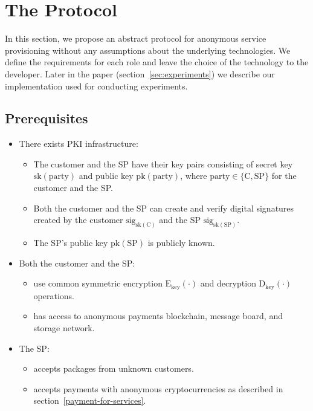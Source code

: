 \section{The Protocol}\label{sec:protocol}
In this section, we propose an abstract protocol for anonymous service provisioning without any assumptions about the underlying technologies. We define the requirements for each role and leave the choice of the technology to the developer. Later in the paper (section~\ref{sec:experiments}) we describe our implementation used for conducting experiments.

\subsection{Prerequisites}

\begin{itemize}
\item There exists PKI infrastructure:
    \begin{itemize}
        \item The customer and the SP have their key pairs consisting of secret key $\mathrm{sk}(\mathrm{party})$ and public key $\mathrm{pk}(\mathrm{party})$, where $\mathrm{party} \in \{\mathrm{C}, \mathrm{SP}\}$ for the customer and the SP.
        \item Both the customer and the SP can create and verify digital signatures created by the customer $\mathrm{sig}_{\mathrm{sk}(\mathrm{C})}$ and the SP $\mathrm{sig}_{\mathrm{sk}(\mathrm{SP})}$.
        \item The SP's public key $\mathrm{pk}(\mathrm{SP})$ is publicly known.
    \end{itemize}
    
\item Both the customer and the SP:
    \begin{itemize}
        \item use common symmetric encryption $\mathrm{E}_\mathrm{key}(\cdot)$ and decryption $\mathrm{D}_\mathrm{key}(\cdot)$ operations.
        \item has access to anonymous payments blockchain, message board, and storage network.
    \end{itemize}

\item The SP:
    \begin{itemize}
        \item accepts packages from unknown customers.
        \item accepts payments with anonymous cryptocurrencies as described in section~\ref{payment-for-services}.
    \end{itemize}
    

\end{itemize}
